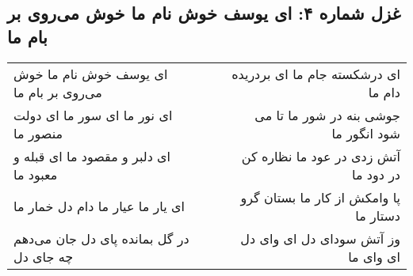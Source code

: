 \begin{center}
\section*{غزل شماره ۴: ای یوسف خوش نام ما خوش می‌روی بر بام ما}
\label{sec:0004}
\begin{longtable}{l p{0.5cm} r}
ای یوسف خوش نام ما خوش می‌روی بر بام ما
&&
ای درشکسته جام ما ای بردریده دام ما
\\
ای نور ما ای سور ما ای دولت منصور ما
&&
جوشی بنه در شور ما تا می شود انگور ما
\\
ای دلبر و مقصود ما ای قبله و معبود ما
&&
آتش زدی در عود ما نظاره کن در دود ما
\\
ای یار ما عیار ما دام دل خمار ما
&&
پا وامکش از کار ما بستان گرو دستار ما
\\
در گل بمانده پای دل جان می‌دهم چه جای دل
&&
وز آتش سودای دل ای وای دل ای وای ما
\\
\end{longtable}
\end{center}
